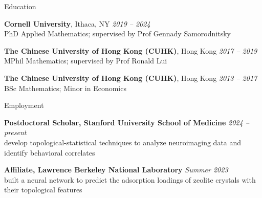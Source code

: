 \documentclass{resume} %
\begin{document}

\begin{rSection}{Education}

{\bf Cornell University}, Ithaca, NY \hfill
{\em 2019 -- 2024} \\
PhD Applied Mathematics; supervised by Prof Gennady Samorodnitsky

{\bf The Chinese University of Hong Kong (CUHK)}, Hong Kong \hfill
{\em 2017 -- 2019} \\
MPhil Mathematics; supervised by Prof Ronald Lui %

{\bf The Chinese University of Hong Kong (CUHK)}, Hong Kong \hfill
{\em 2013 -- 2017} \\
BSc Mathematics; Minor in Economics %




\end{rSection}

\begin{rSection}{Employment}

{\bf Postdoctoral Scholar, Stanford University School of Medicine} \hfill
{\em 2024 -- present} \\
develop topological-statistical techniques to analyze neuroimaging data and identify behavioral correlates

{\bf Affiliate, Lawrence Berkeley National Laboratory} \hfill
{\em Summer 2023} \\
built a neural network to predict the adsorption loadings of zeolite crystals with their topological features

\end{rSection}
\end{document}
